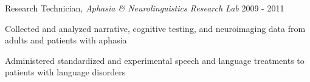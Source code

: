 \begin{cventries}
  \cventry
    {Research Technician, \textit{Aphasia \& Neurolinguistics Research Lab}} %
    {} %
    {} %
    {2009 - 2011} %
    {
      \begin{cvitems} %
        \item {Collected and analyzed narrative, cognitive testing, and neuroimaging data from adults and patients with aphasia}
        \item {Administered standardized and experimental speech and language treatments to patients with language disorders}
      \end{cvitems}
    }

\end{cventries}
